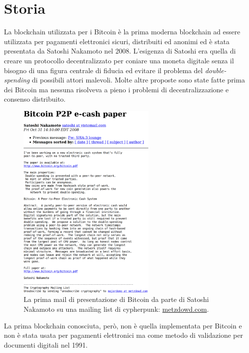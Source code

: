 \section{Storia}
La blockchain utilizzata per i Bitcoin è la prima moderna blockchain ad essere utilizzata per pagamenti elettronici sicuri, distribuiti ed anonimi ed è stata presentata da Satoshi Nakamoto nel 2008. L'esigenza di Satoshi era quella di creare un protocollo decentralizzato per coniare una moneta digitale senza il bisogno di una figura centrale di fiducia ed evitare il problema del \textit{double-spending} di possibili attori malevoli.
Molte altre proposte sono state fatte prima dei Bitcoin ma nessuna risolveva a pieno i problemi di decentralizzazione e consenso distribuito.
\begin{figure}
    \centering
    \includegraphics[width=0.6\textwidth]{images/satoshimail.png}
    \caption{La prima mail di presentazione di Bitcoin da parte di Satoshi Nakamoto su una mailing list di cypherpunk: \href{metzdowd.com}{metzdowd.com}.}
\end{figure}

La prima blockchain conosciuta, però, non è quella implementata per Bitcoin e non è stata usata per pagamenti elettronici ma come metodo di validazione per documenti digitali nel 1991.

